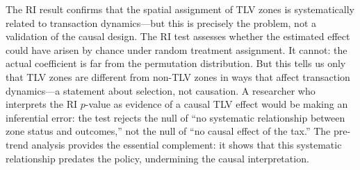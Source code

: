 \documentclass[12pt]{article}
\begin{document}
The RI result confirms that the spatial assignment of TLV zones is systematically related to transaction dynamics---but this is precisely the problem, not a validation of the causal design. The RI test assesses whether the estimated effect could have arisen by chance under random treatment assignment. It cannot: the actual coefficient is far from the permutation distribution. But this tells us only that TLV zones are different from non-TLV zones in ways that affect transaction dynamics---a statement about selection, not causation. A researcher who interprets the RI $p$-value as evidence of a causal TLV effect would be making an inferential error: the test rejects the null of ``no systematic relationship between zone status and outcomes,'' not the null of ``no causal effect of the tax.'' The pre-trend analysis provides the essential complement: it shows that this systematic relationship predates the policy, undermining the causal interpretation.
\end{document}
